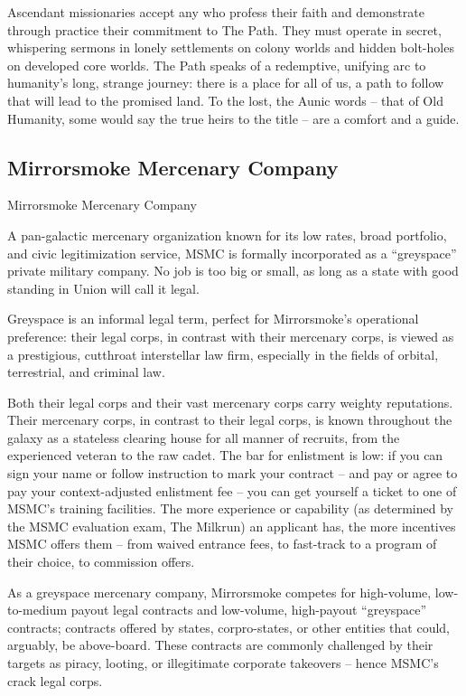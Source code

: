Ascendant missionaries accept any who profess their faith and demonstrate through practice
their commitment to The Path. They must operate in secret, whispering sermons in lonely
settlements on colony worlds and hidden bolt-holes on developed core worlds. The Path speaks
of a redemptive, unifying arc to humanity’s long, strange journey: there is a place for all of us, a
path to follow that will lead to the promised land. To the lost, the Aunic words -- that of Old
Humanity, some would say the true heirs to the title -- are a comfort and a guide.

\subsection{Mirrorsmoke Mercenary Company}
Mirrorsmoke Mercenary Company

A pan-galactic mercenary organization known for its low rates, broad portfolio, and civic
legitimization service, MSMC is formally incorporated as a “greyspace” private military company.
No job is too big or small, as long as a state with good standing in Union will call it legal.




Greyspace is an informal legal term, perfect for Mirrorsmoke’s operational preference: their legal
corps, in contrast with their mercenary corps, is viewed as a prestigious, cutthroat interstellar law
firm, especially in the fields of orbital, terrestrial, and criminal  law.


Both their legal corps and their vast mercenary corps carry weighty reputations. Their mercenary
corps, in contrast to their legal corps, is known throughout the galaxy as a stateless clearing
house for all manner of recruits, from the experienced veteran to the raw cadet. The bar for
enlistment is low: if you can sign your name or follow instruction to mark your contract -- and
pay or agree to pay your context-adjusted enlistment fee -- you can get yourself a ticket to one
of MSMC’s training facilities. The more experience or capability (as determined by the MSMC
evaluation exam, The Milkrun) an applicant has, the more incentives MSMC offers them -- from
waived entrance fees, to fast-track to a program of their choice, to commission offers.


As a greyspace mercenary company, Mirrorsmoke competes for high-volume, low-to-medium
payout legal contracts and low-volume, high-payout “greyspace” contracts; contracts offered by
states, corpro-states, or other entities that could, arguably, be above-board. These contracts are
commonly challenged by their targets as piracy, looting, or illegitimate corporate takeovers --
hence MSMC’s crack legal corps.


